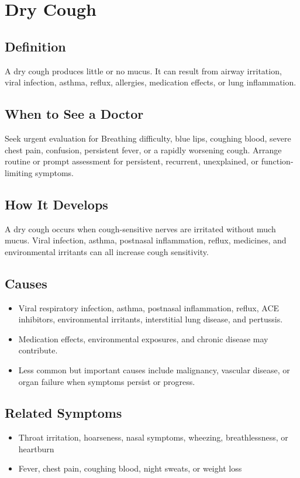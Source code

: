 \chapter{Dry Cough}

\section*{Definition}
A dry cough produces little or no mucus. It can result from airway irritation, viral infection, asthma, reflux, allergies, medication effects, or lung inflammation.

\section*{When to See a Doctor}
Seek urgent evaluation for Breathing difficulty, blue lips, coughing blood, severe chest pain, confusion, persistent fever, or a rapidly worsening cough. Arrange routine or prompt assessment for persistent, recurrent, unexplained, or function-limiting symptoms.

\section*{How It Develops}
A dry cough occurs when cough-sensitive nerves are irritated without much mucus. Viral infection, asthma, postnasal inflammation, reflux, medicines, and environmental irritants can all increase cough sensitivity.

\section*{Causes}
\begin{itemize}
  \item Viral respiratory infection, asthma, postnasal inflammation, reflux, ACE inhibitors, environmental irritants, interstitial lung disease, and pertussis.
  \item Medication effects, environmental exposures, and chronic disease may contribute.
  \item Less common but important causes include malignancy, vascular disease, or organ failure when symptoms persist or progress.
\end{itemize}

\section*{Related Symptoms}
\begin{itemize}
  \item Throat irritation, hoarseness, nasal symptoms, wheezing, breathlessness, or heartburn
  \item Fever, chest pain, coughing blood, night sweats, or weight loss
\end{itemize}

